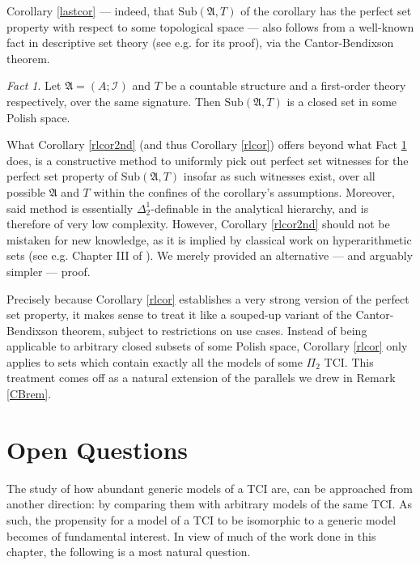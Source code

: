\documentclass[12pt, twoside]{memoir}
\numberwithin{equation}{section}
\theoremstyle{definition}
\theoremstyle{remark}
\newtheorem{fact}[thm]{Fact}
\theoremstyle{definition}
\theoremstyle{definition}
\theoremstyle{definition}
\theoremstyle{remark}
\begin{document}
Corollary \ref{lastcor} --- indeed, that $\mathrm{Sub}(\mathfrak{A}, T)$ of the corollary has the perfect set property with respect to some topological space --- also follows from a well-known fact in descriptive set theory (see e.g. \cite{kechris} for its proof), via the Cantor-Bendixson theorem. 

\begin{fact}\label{lastfact}
Let $\mathfrak{A} = (A; \mathcal{I})$ and $T$ be a countable structure and a first-order theory respectively, over the same signature. Then $\mathrm{Sub}(\mathfrak{A}, T)$ is a closed set in some Polish space.
\end{fact}

What Corollary \ref{rlcor2nd} (and thus Corollary \ref{rlcor}) offers beyond what Fact \ref{lastfact} does, is a constructive method to uniformly pick out perfect set witnesses for the perfect set property of $\mathrm{Sub}(\mathfrak{A}, T)$ insofar as such witnesses exist, over all possible $\mathfrak{A}$ and $T$ within the confines of the corollary's assumptions. Moreover, said method is essentially $\Delta^1_2$-definable in the analytical hierarchy, and is therefore of very low complexity. However, Corollary \ref{rlcor2nd} should not be mistaken for new knowledge, as it is implied by classical work on hyperarithmetic sets (see e.g. Chapter III of \cite{sacks}). We merely provided an alternative --- and arguably simpler --- proof.

Precisely because Corollary \ref{rlcor} establishes a very strong version of the perfect set property, it makes sense to treat it like a souped-up variant of the Cantor-Bendixson theorem, subject to restrictions on use cases. Instead of being applicable to arbitrary closed subsets of some Polish space, Corollary \ref{rlcor} only applies to sets which contain exactly all the models of some $\Pi_2$ TCI. This treatment comes off as a natural extension of the parallels we drew in Remark \ref{CBrem}.

\section{Open Questions}

The study of how abundant generic models of a TCI are, can be approached from another direction: by comparing them with arbitrary models of the same TCI. As such, the propensity for a model of a TCI to be isomorphic to a generic model becomes of fundamental interest. In view of much of the work done in this chapter, the following is a most natural question.
\end{document}
